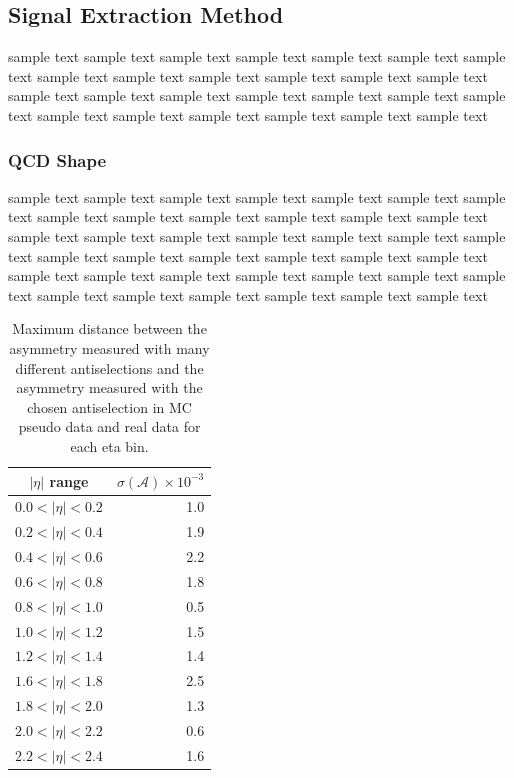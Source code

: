 \subsection{Signal Extraction Method}
sample text sample text sample text sample text sample text sample text sample
text sample text sample text sample text sample text sample text sample text
sample text sample text sample text sample text sample text sample text sample
text sample text sample text sample text sample text sample text sample text

\subsubsection{QCD \ETm Shape}
sample text sample text sample text sample text sample text sample text sample
text sample text sample text sample text sample text sample text sample text
sample text sample text sample text sample text sample text sample text sample
text sample text sample text sample text sample text sample text sample text
sample text sample text sample text sample text sample text sample text sample
text sample text sample text sample text sample text sample text sample text


\begin{table}[htb]
\begin{center}
\begin{tabular}{cr}
$|\eta|$ range  & $\sigma(\mathcal{A}) \times 10^{-3}$\\
\hline
$0.0<|\eta|<0.2$ & 1.0\\
$0.2<|\eta|<0.4$ & 1.9\\
$0.4<|\eta|<0.6$ & 2.2\\
$0.6<|\eta|<0.8$ & 1.8\\
$0.8<|\eta|<1.0$ & 0.5\\
$1.0<|\eta|<1.2$ & 1.5\\
$1.2<|\eta|<1.4$ & 1.4\\
$1.6<|\eta|<1.8$ & 2.5\\
$1.8<|\eta|<2.0$ & 1.3\\
$2.0<|\eta|<2.2$ & 0.6\\
$2.2<|\eta|<2.4$ & 1.6\\
\end{tabular}
\caption{Maximum distance between the asymmetry measured with many different antiselections
and the asymmetry measured with the chosen antiselection in MC pseudo data and real data for each eta bin.}
\label{tab:systQCD}
\end{center}
\end{table}

